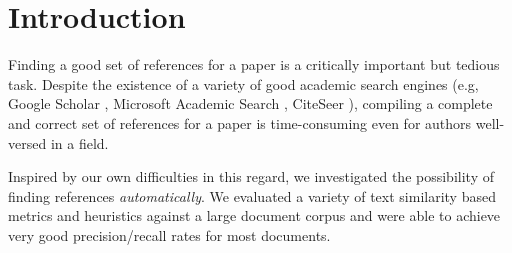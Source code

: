 \section{Introduction}

Finding a good set of references for a paper is a critically important 
but tedious task.  Despite the existence of a variety of good academic
search engines (e.g, Google Scholar \cite{Scholar}, 
Microsoft Academic Search \cite{MSAcademic}, CiteSeer \cite{citeseer}), compiling
a complete and correct set of references for a paper is time-consuming
even for authors well-versed in a field.

Inspired by our own difficulties in this regard, we investigated the
possibility of finding references \emph{automatically}.  We evaluated
a variety of text similarity based metrics and heuristics against a 
large document corpus and were able to achieve very good precision/recall
rates for most documents.


